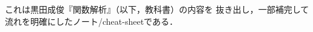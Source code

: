 \documentclass[a4j]{jsarticle}
\begin{document}
    これは黒田成俊『関数解析』（以下，教科書）の内容を
    抜き出し，一部補完して流れを明確にしたノート/cheat-sheetである．

    
    
    
\end{document}
